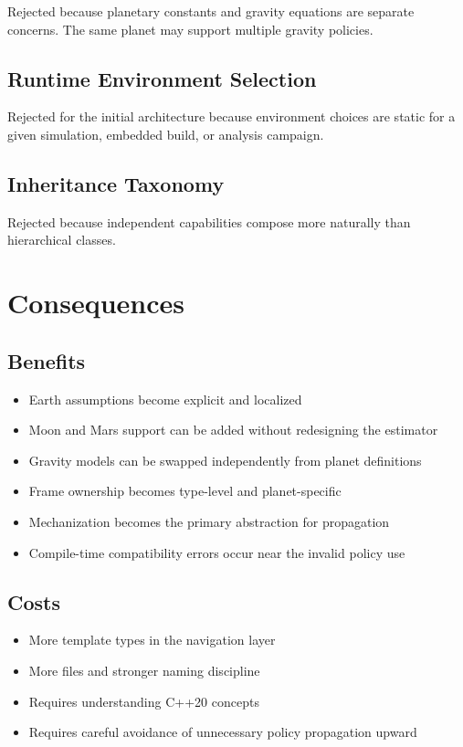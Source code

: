 \documentclass[11pt]{article}
\begin{document}
Rejected because planetary constants and gravity equations are separate
concerns. The same planet may support multiple gravity policies.

\subsection{Runtime Environment Selection}

Rejected for the initial architecture because environment choices are static
for a given simulation, embedded build, or analysis campaign.

\subsection{Inheritance Taxonomy}

Rejected because independent capabilities compose more naturally than
hierarchical classes.

\section{Consequences}

\subsection{Benefits}

\begin{itemize}
    \item Earth assumptions become explicit and localized
    \item Moon and Mars support can be added without redesigning the estimator
    \item Gravity models can be swapped independently from planet definitions
    \item Frame ownership becomes type-level and planet-specific
    \item Mechanization becomes the primary abstraction for propagation
    \item Compile-time compatibility errors occur near the invalid policy use
\end{itemize}

\subsection{Costs}

\begin{itemize}
    \item More template types in the navigation layer
    \item More files and stronger naming discipline
    \item Requires understanding C++20 concepts
    \item Requires careful avoidance of unnecessary policy propagation upward
\end{itemize}
\end{document}

